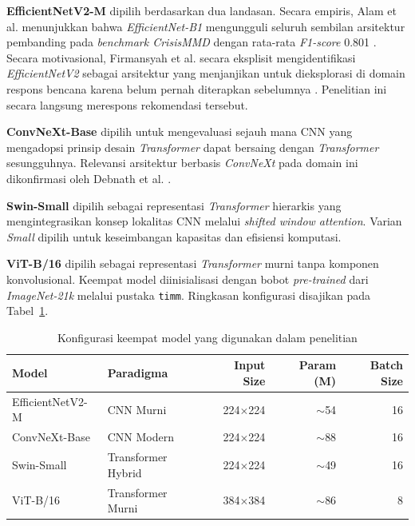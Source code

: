\textbf{EfficientNetV2-M} dipilih berdasarkan dua landasan. Secara
empiris, Alam et al. menunjukkan bahwa \textit{EfficientNet-B1}
mengungguli seluruh sembilan arsitektur pembanding pada
\textit{benchmark CrisisMMD} dengan rata-rata \textit{F1-score} 0.801
\cite{ofli2020benchmarks}. Secara motivasional, Firmansyah et al.
secara eksplisit mengidentifikasi \textit{EfficientNetV2} sebagai
arsitektur yang menjanjikan untuk dieksplorasi di domain respons
bencana karena belum pernah diterapkan sebelumnya
\cite{firmansyah2022ensemble}. Penelitian ini secara langsung
merespons rekomendasi tersebut. \par

\textbf{ConvNeXt-Base} dipilih untuk mengevaluasi sejauh mana CNN yang
mengadopsi prinsip desain \textit{Transformer} dapat bersaing dengan
\textit{Transformer} sesungguhnya. Relevansi arsitektur berbasis
\textit{ConvNeXt} pada domain ini dikonfirmasi oleh Debnath et al.
\cite{debnath2024convsfnet}. \par

\textbf{Swin-Small} dipilih sebagai representasi \textit{Transformer}
hierarkis yang mengintegrasikan konsep lokalitas CNN melalui
\textit{shifted window attention}. Varian \textit{Small} dipilih untuk
keseimbangan kapasitas dan efisiensi komputasi. \par

\textbf{ViT-B/16} dipilih sebagai representasi \textit{Transformer}
murni tanpa komponen konvolusional. Keempat model diinisialisasi
dengan bobot \textit{pre-trained} dari \textit{ImageNet-21k} melalui
pustaka \texttt{timm}. Ringkasan konfigurasi disajikan pada
Tabel~\ref{table:model_config}. \par

\begin{table}[h]
    \centering
    \caption{Konfigurasi keempat model yang digunakan dalam penelitian}
    \label{table:model_config}
    \begin{tabular}{|l|l|r|r|r|}
        \hline
        \textbf{Model} & \textbf{Paradigma} &
        \textbf{Input Size} & \textbf{Param (M)} &
        \textbf{Batch Size} \\
        \hline
        EfficientNetV2-M & CNN Murni           & 224$\times$224 & $\sim$54 & 16 \\
        ConvNeXt-Base    & CNN Modern          & 224$\times$224 & $\sim$88 & 16 \\
        Swin-Small       & Transformer Hybrid  & 224$\times$224 & $\sim$49 & 16 \\
        ViT-B/16         & Transformer Murni   & 384$\times$384 & $\sim$86 & 8  \\
        \hline
    \end{tabular}
\end{table}

